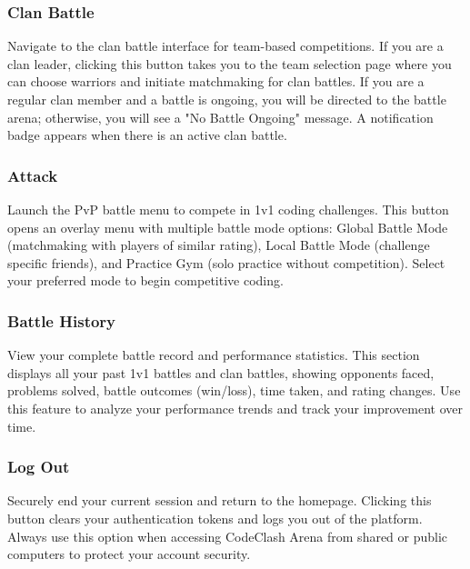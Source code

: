 \documentclass[12pt,a4paper]{article}
\begin{document}
\subsubsection{Clan Battle}

Navigate to the clan battle interface for team-based competitions. If you are a clan leader, clicking this button takes you to the team selection page where you can choose warriors and initiate matchmaking for clan battles. If you are a regular clan member and a battle is ongoing, you will be directed to the battle arena; otherwise, you will see a "No Battle Ongoing" message. A notification badge appears when there is an active clan battle.

\subsubsection{Attack}

Launch the PvP battle menu to compete in 1v1 coding challenges. This button opens an overlay menu with multiple battle mode options: Global Battle Mode (matchmaking with players of similar rating), Local Battle Mode (challenge specific friends), and Practice Gym (solo practice without competition). Select your preferred mode to begin competitive coding.

\subsubsection{Battle History}

View your complete battle record and performance statistics. This section displays all your past 1v1 battles and clan battles, showing opponents faced, problems solved, battle outcomes (win/loss), time taken, and rating changes. Use this feature to analyze your performance trends and track your improvement over time.

\subsubsection{Log Out}

Securely end your current session and return to the homepage. Clicking this button clears your authentication tokens and logs you out of the platform. Always use this option when accessing CodeClash Arena from shared or public computers to protect your account security.

\FloatBarrier

\end{document}
